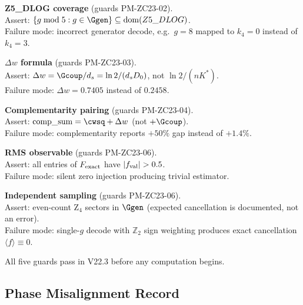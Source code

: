 \documentclass[12pt, a4paper]{article}
\begin{document}
\begin{formalbox}[title={Anti-Error Guards (GUARD-01 through GUARD-05)}]
\label{zc23:box:guards}
\begin{description}[leftmargin=2.5cm, style=nextline, noitemsep]
  \item[\textsc{Guard-01}]
    \textbf{Z5\_DLOG coverage} (guards PM-ZC23-02).\\
    Assert: $\{g\bmod 5 : g\in\Ggen\} \subseteq \mathrm{dom}(Z5\_DLOG)$.\\
    Failure mode: incorrect generator decode, e.g.\ $g=8$ mapped to
    $k_4=0$ instead of $k_4=3$.

  \item[\textsc{Guard-02}]
    \textbf{$\Delta w$ formula} (guards PM-ZC23-03).\\
    Assert: $\Delta w = \Gcoup/d_s = \ln 2/(d_s D_0)$,
    not $\ln 2/(n K^*)$.\\
    Failure mode: $\Delta w = 0.7405$ instead of $0.2458$.

  \item[\textsc{Guard-03}]
    \textbf{Complementarity pairing} (guards PM-ZC23-04).\\
    Assert: $\mathrm{comp\_sum} = \cwsq + \Delta w$ (not $+\Gcoup$).\\
    Failure mode: complementarity reports $+50\%$ gap instead of $+1.4\%$.

  \item[\textsc{Guard-04}]
    \textbf{RMS observable} (guards PM-ZC23-06).\\
    Assert: all entries of $F_{\rm exact}$ have $|f_{\rm val}|>0.5$.\\
    Failure mode: silent zero injection producing trivial estimator.

  \item[\textsc{Guard-05}]
    \textbf{Independent sampling} (guards PM-ZC23-06).\\
    Assert: even-count Z$_4$ sectors in $\Ggen$ (expected cancellation
    is documented, not an error).\\
    Failure mode: single-$g$ decode with $\mathbb{Z}_2$ sign weighting
    produces exact cancellation $\langle f\rangle\equiv 0$.
\end{description}
All five guards pass in V22.3 before any computation begins.
\end{formalbox}

\subsection{Phase Misalignment Record}
\label{zc23:sec:pms}
\end{document}
